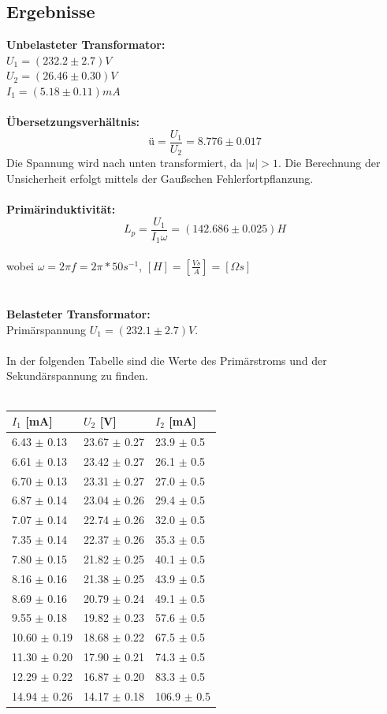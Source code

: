 \documentclass{article}
\begin{document}
\subsection{Ergebnisse}
\textbf{Unbelasteter Transformator:}\\
$U_1=(232.2 \pm 2.7)V$\\
$U_2=(26.46 \pm 0.30)V$\\
$I_1=(5.18 \pm 0.11)mA$\\
\\
\textbf{Übersetzungsverhältnis:}\\
$$\textrm{ü}=\frac{U_1}{U_2}=8.776 \pm 0.017$$
Die Spannung wird nach unten transformiert, da $|u|>1$. Die Berechnung der Unsicherheit erfolgt mittels der Gaußschen Fehlerfortpflanzung. \\
\\
\textbf{Primärinduktivität:}\\

$$\boxed{L_p=\frac{U_1}{I_1 \omega}=(142.686 \pm 0.025)H}$$\\
wobei $\omega =2\pi f=2\pi*50s^{-1}$, $[H]=[\frac{Vs}{A}]=[\Omega s]$\\
\\
\\
\textbf{Belasteter Transformator:}\\
Primärspannung $U_1=(232.1 \pm 2.7)V$.\\
\\
In der folgenden Tabelle sind die Werte des Primärstroms und der Sekundärspannung zu finden.\\
\\
\begin{tabular}{|l|l|l|}
\hline
$I_1$ [mA] & $U_2$ [V] & $I_2$ [mA]\\
\hline
6.43 $\pm$ 0.13 & 23.67 $\pm$ 0.27 & 23.9 $\pm$ 0.5\\
6.61 $\pm$ 0.13 & 23.42 $\pm$ 0.27 & 26.1 $\pm$ 0.5\\
6.70 $\pm$ 0.13 & 23.31 $\pm$ 0.27 & 27.0 $\pm$ 0.5\\
6.87 $\pm$ 0.14 & 23.04 $\pm$ 0.26 & 29.4 $\pm$ 0.5\\
7.07 $\pm$ 0.14 & 22.74 $\pm$ 0.26 & 32.0 $\pm$ 0.5\\
7.35 $\pm$ 0.14 & 22.37 $\pm$ 0.26 & 35.3 $\pm$ 0.5\\
7.80 $\pm$ 0.15 & 21.82 $\pm$ 0.25 & 40.1 $\pm$ 0.5\\
8.16 $\pm$ 0.16 & 21.38 $\pm$ 0.25 & 43.9 $\pm$ 0.5\\
8.69 $\pm$ 0.16 & 20.79 $\pm$ 0.24 & 49.1 $\pm$ 0.5\\
9.55 $\pm$ 0.18 & 19.82 $\pm$ 0.23 & 57.6 $\pm$ 0.5\\
10.60 $\pm$ 0.19 & 18.68 $\pm$ 0.22 & 67.5 $\pm$ 0.5\\
11.30 $\pm$ 0.20 & 17.90 $\pm$ 0.21 & 74.3 $\pm$ 0.5\\
12.29 $\pm$ 0.22 & 16.87 $\pm$ 0.20 & 83.3 $\pm$ 0.5\\
14.94 $\pm$ 0.26 & 14.17 $\pm$ 0.18 & 106.9 $\pm$ 0.5\\
\hline
\end{tabular}
\end{document}
